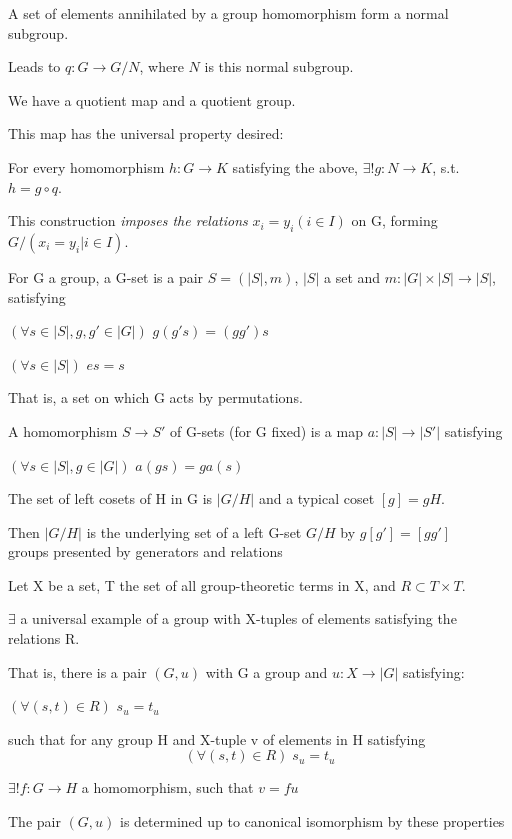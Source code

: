 \documentclass[12pt]{article}
\begin{document}
A set of elements annihilated by a group homomorphism form a normal subgroup.

Leads to $q: G \to G\slash N$, where $N$ is this normal subgroup.

We have a quotient map and a quotient group.

\noindent
This map has the universal property desired:

For every homomorphism $h: G \to K$ satisfying the above, $\exists ! g : N \to K$, s.t. $h = g \circ q$.

\noindent
This construction \textit{imposes the relations} $x_i = y_i (i \in I)$ on G, forming $G \slash (x_i = y_i | i \in I)$.

\noindent
For G a group, a G-set is a pair $S = (|S|, m)$, $|S|$ a set and $m: |G| \times |S| \to |S|$, satisfying

$(\forall s \in |S|, g, g' \in |G|)$ $g(g's) = (gg')s$

$(\forall s \in |S|)$ $es = s$

That is, a set on which G acts by permutations.

\noindent
A homomorphism $S \to S'$ of G-sets (for G fixed) is a map $a: |S| \to |S'|$ satisfying

$(\forall s \in |S|, g \in |G|)$ $a(gs) = g a (s)$

\noindent
The set of left cosets of H in G is $|G \slash H|$ and a typical coset $[g] = gH$.

Then $|G\slash H|$ is the underlying set of a left G-set $G\slash H$ by $g[g'] = [gg']$\\

\noindent
groups presented by generators and relations

Let X be a set, T the set of all group-theoretic terms in X, and $R \subset T \times T$.

$\exists$ a universal example of a group with X-tuples of elements satisfying the relations R.

\noindent
That is, there is a pair $(G, u)$ with G a group and $u: X \to |G|$ satisfying:

$(\forall (s, t) \in R)$ $s_u = t_u$

such that for any group H and X-tuple v of elements in H satisfying $$(\forall (s, t) \in R) \; s_u = t_u$$

$\exists ! f: G \to H$ a homomorphism, such that $v = fu$

The pair $(G, u)$ is determined up to canonical isomorphism by these properties
\end{document}
